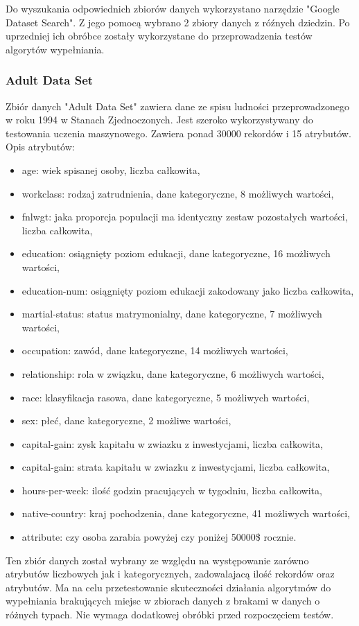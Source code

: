 \documentclass[12pt,twoside]{article}
\begin{document}
Do wyszukania odpowiednich zbiorów danych wykorzystano narzędzie "Google Dataset Search".
Z jego pomocą wybrano 2 zbiory danych z róźnych dziedzin.
Po uprzedniej ich obróbce zostały wykorzystane do przeprowadzenia testów algorytów wypełniania.
\subsubsection{Adult Data Set}

Zbiór danych "Adult Data Set" zawiera dane ze spisu ludności przeprowadzonego w roku 1994 w Stanach Zjednoczonych.
Jest szeroko wykorzystywany do testowania uczenia maszynowego.
Zawiera ponad 30000 rekordów i 15 atrybutów. \cite{adult} Opis atrybutów:
\begin{itemize}[label=-,labelsep=0.4cm, leftmargin=1.25cm]
    \item age: wiek spisanej osoby, liczba całkowita,
    \item workclass: rodzaj zatrudnienia, dane kategoryczne, 8 możliwych wartości,
    \item fnlwgt: jaka proporcja populacji ma identyczny zestaw pozostałych wartości, liczba całkowita,
    \item education: osiągnięty poziom edukacji, dane kategoryczne, 16 możliwych wartości,
    \item education-num: osiągnięty poziom edukacji zakodowany jako liczba całkowita,
    \item martial-status: status matrymonialny, dane kategoryczne, 7 możliwych wartości,
    \item occupation: zawód, dane kategoryczne, 14 możliwych wartości,
    \item relationship: rola w związku, dane kategoryczne, 6 możliwych wartości,
    \item race: klasyfikacja rasowa, dane kategoryczne, 5 możliwych wartości,
    \item sex: płeć, dane kategoryczne, 2 możliwe wartości,
    \item capital-gain: zysk kapitału w zwiazku z inwestycjami, liczba całkowita,
    \item capital-gain: strata kapitału w zwiazku z inwestycjami, liczba całkowita,
    \item hours-per-week: ilość godzin pracujących w tygodniu, liczba całkowita,
    \item native-country: kraj pochodzenia, dane kategoryczne, 41 możliwych wartości,
    \item attribute: czy osoba zarabia powyżej czy poniżej 50000\$ rocznie.
\end{itemize}
Ten zbiór danych został wybrany ze względu na występowanie zarówno atrybutów liczbowych jak i kategorycznych,
zadowalajacą ilość rekordów oraz atrybutów.
Ma na celu przetestowanie skuteczności działania algorytmów do wypełniania brakujących miejsc
w zbiorach danych z brakami w danych o różnych typach.
Nie wymaga dodatkowej obróbki przed rozpoczęciem testów. 
\end{document}
